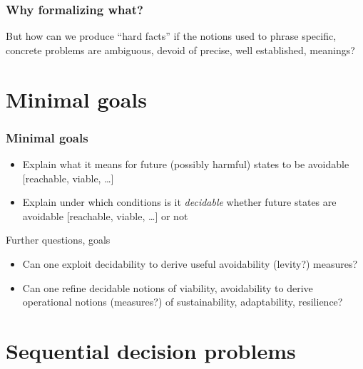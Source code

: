 \documentclass[colorhighlight,coloremph]{beamer}
\begin{document}

\begin{frame}[fragile]
\frametitle{Why formalizing what?}
%
But how can we produce ``hard facts'' if the notions used to phrase
specific, concrete problems are ambiguous, devoid of precise, well
established, meanings?
%
\end{frame}


\section{Minimal goals}


\begin{frame}[fragile]
\frametitle{Minimal goals}
%
\begin{itemize}
  \vspace{0.3\normalbaselineskip}
  \pause
  \item Explain what it means for future (possibly harmful) states to be
    avoidable [reachable, viable, \dots]
  \vspace{0.3\normalbaselineskip}
  \pause
  \item Explain under which conditions is it \emph{decidable}
    whether future states are avoidable [reachable, viable, \dots] or not
\end{itemize}
\pause
Further questions, goals
\begin{itemize}
  \vspace{0.3\normalbaselineskip}
  \pause
  \item Can one exploit decidability to derive useful avoidability
    (levity?) measures?
  \vspace{0.3\normalbaselineskip}
  \pause
  \item Can one refine decidable notions of viability, avoidability to
    derive operational notions (measures?) of sustainability,
    adaptability, resilience?
\end{itemize}
%
\end{frame}



\section{Sequential decision problems}
\end{document}
